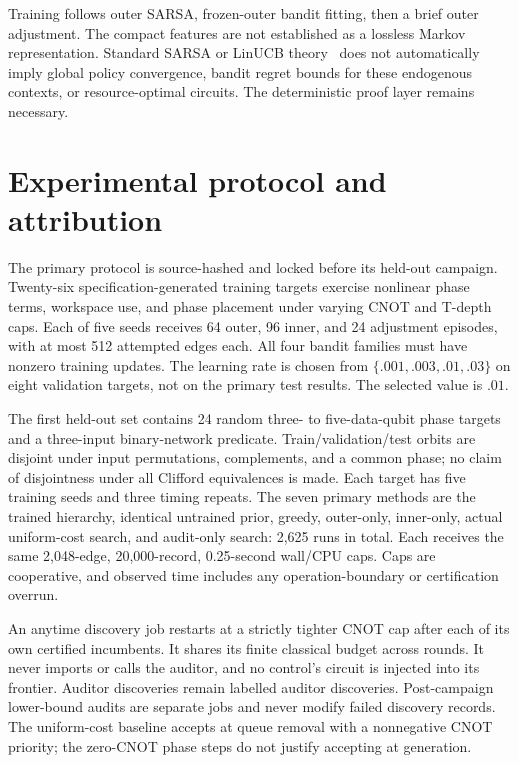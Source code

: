 \documentclass[11pt]{article}
\theoremstyle{definition}\newtheorem{definition}[theorem]{Definition}
\begin{document}
Training follows outer SARSA, frozen-outer bandit fitting, then a brief outer adjustment. The compact features are not established as a lossless Markov representation. Standard SARSA or LinUCB theory~\cite{sutton2018,li2010} does not automatically imply global policy convergence, bandit regret bounds for these endogenous contexts, or resource-optimal circuits. The deterministic proof layer remains necessary.

\section{Experimental protocol and attribution}
The primary protocol is source-hashed and locked before its held-out campaign. Twenty-six specification-generated training targets exercise nonlinear phase terms, workspace use, and phase placement under varying CNOT and T-depth caps. Each of five seeds receives 64 outer, 96 inner, and 24 adjustment episodes, with at most 512 attempted edges each. All four bandit families must have nonzero training updates. The learning rate is chosen from $\{.001,.003,.01,.03\}$ on eight validation targets, not on the primary test results. The selected value is $.01$.

The first held-out set contains 24 random three- to five-data-qubit phase targets and a three-input binary-network predicate. Train/validation/test orbits are disjoint under input permutations, complements, and a common phase; no claim of disjointness under all Clifford equivalences is made. Each target has five training seeds and three timing repeats. The seven primary methods are the trained hierarchy, identical untrained prior, greedy, outer-only, inner-only, actual uniform-cost search, and audit-only search: 2,625 runs in total. Each receives the same 2,048-edge, 20,000-record, 0.25-second wall/CPU caps. Caps are cooperative, and observed time includes any operation-boundary or certification overrun.

An anytime discovery job restarts at a strictly tighter CNOT cap after each of its own certified incumbents. It shares its finite classical budget across rounds. It never imports or calls the auditor, and no control's circuit is injected into its frontier. Auditor discoveries remain labelled auditor discoveries. Post-campaign lower-bound audits are separate jobs and never modify failed discovery records. The uniform-cost baseline accepts at queue removal with a nonnegative CNOT priority; the zero-CNOT phase steps do not justify accepting at generation.
\end{document}
